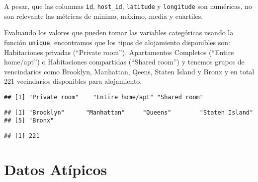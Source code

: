 \documentclass[
]{book}
\newenvironment{Shaded}{\begin{snugshade}}{\end{snugshade}}
\newcommand{\FunctionTok}[1]{\textcolor[rgb]{0.00,0.00,0.00}{#1}}
\newcommand{\NormalTok}[1]{#1}
\newcommand{\SpecialCharTok}[1]{\textcolor[rgb]{0.00,0.00,0.00}{#1}}
\begin{document}
A pesar, que las columnas \texttt{id}, \texttt{host\_id}, \texttt{latitude} y \texttt{longitude} son numéricas, no son relevante las métricas de minimo, máximo, media y cuartiles.

Evaluando los valores que pueden tomar las variables categóricas usando la función \texttt{unique}, encontramos que los tipos de alojamiento disponibles son: Habitaciones privadas (``Private room''), Apartamentos Completos (``Entire home/apt'') o Habitaciones compartidas (``Shared room'') y tenemos grupos de vencindarios como Brooklyn, Manhattan, Qeens, Staten Island y Bronx y en total 221 vecindarios disponibles para alojamiento.

\begin{Shaded}
\end{Shaded}

\begin{verbatim}
## [1] "Private room"    "Entire home/apt" "Shared room"
\end{verbatim}

\begin{Shaded}
\end{Shaded}

\begin{verbatim}
## [1] "Brooklyn"      "Manhattan"     "Queens"        "Staten Island"
## [5] "Bronx"
\end{verbatim}

\begin{Shaded}
\end{Shaded}

\begin{verbatim}
## [1] 221
\end{verbatim}

\hypertarget{datos-atuxedpicos}{%
\section*{Datos Atípicos}\label{datos-atuxedpicos}}
\end{document}
